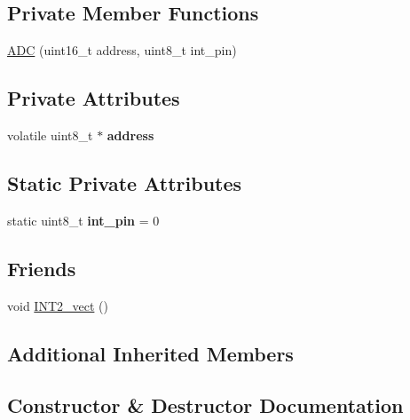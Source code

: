 \subsection*{Private Member Functions}
\begin{DoxyCompactItemize}
\item 
\hyperlink{class_a_d_c_a0818050dee0dd8789966db0f429ef0bd}{A\+DC} (uint16\+\_\+t address, uint8\+\_\+t int\+\_\+pin)
\end{DoxyCompactItemize}
\subsection*{Private Attributes}
\begin{DoxyCompactItemize}
\item 
volatile uint8\+\_\+t $\ast$ {\bfseries address}\hypertarget{class_a_d_c_aa58c27581281db4bd8537df9ea2b49f2}{}\label{class_a_d_c_aa58c27581281db4bd8537df9ea2b49f2}

\end{DoxyCompactItemize}
\subsection*{Static Private Attributes}
\begin{DoxyCompactItemize}
\item 
static uint8\+\_\+t {\bfseries int\+\_\+pin} = 0\hypertarget{class_a_d_c_a6e0562436e7b39f0e53435ed5cc393a3}{}\label{class_a_d_c_a6e0562436e7b39f0e53435ed5cc393a3}

\end{DoxyCompactItemize}
\subsection*{Friends}
\begin{DoxyCompactItemize}
\item 
void \hyperlink{class_a_d_c_a8f7964aad4550f29972483135452c811}{I\+N\+T2\+\_\+vect} ()
\end{DoxyCompactItemize}
\subsection*{Additional Inherited Members}


\subsection{Constructor \& Destructor Documentation}
